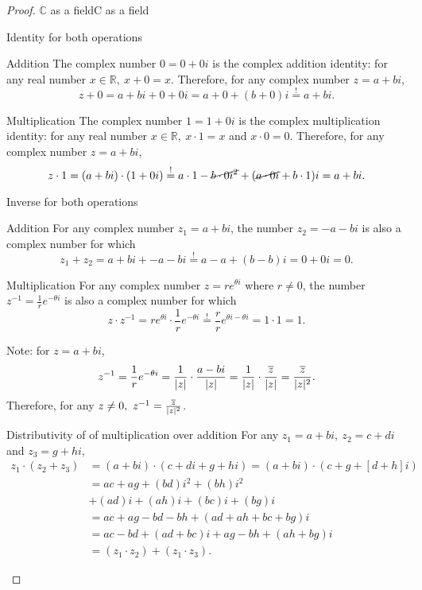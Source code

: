 \begin{proof}{$\bm{\mathbb{C}}$ as a field}{C as a field}
\begin{descitemize}
		\item[Identity for both operations]~\\
			\begin{listitemize}
			\item[Addition] The complex number $0=0+0i$ is the complex addition identity: for any real number $x\in\mathbb{R},\ x+0=x$. Therefore, for any complex number $z=a+bi$,
				\[
					z+0 = a+bi + 0+0i = a+0 + (b+0)i \overset{!}{=} a+bi.
				\]
			\item[Multiplication] The complex number $1=1+0i$ is the complex multiplication identity: for any real number $x\in\mathbb{R},\ x\cdot1=x$ and $x\cdot0=0$. Therefore, for any complex number $z=a+bi$,
				\[
					z\cdot1 = (a+bi)\cdot(1+0i) \overset{!}{=}a\cdot1-\cancel{b\cdot0i^{2}} + (\cancel{a\cdot0i}+b\cdot1)i = a+bi.
				\]

			\end{listitemize}
		
		\item[Inverse for both operations]~\\
			\begin{listitemize}
			\item[Addition] For any complex number $z_{1}=a+bi$, the number $z_{2}=-a-bi$ is also a complex number for which
				\[
					z_{1} + z_{2} = a+bi + -a-bi \overset{!}{=} a-a + (b-b)i = 0 + 0i = 0.
				\]
			\item[Multiplication] For any complex number $z=re^{\theta i}$ where $r\neq0$, the number $z^{-1}=\frac{1}{r}e^{-\theta i}$ is also a complex number for which
				\[
					z \cdot z^{-1} = re^{\theta i} \cdot \frac{1}{r}e^{-\theta i} \overset{!}{=} \frac{r}{r}e^{\theta i - \theta i} = 1\cdot1 = 1.
				\]
				
			Note: for $z=a+bi$,
			\[
				z^{-1} = \frac{1}{r}e^{-\theta i} = \frac{1}{|z|}\cdot\frac{a-bi}{|z|} = \frac{1}{|z|}\cdot\frac{\overline{z}}{|z|} = \frac{\overline{z}}{|z|^{2}}.
			\]
			Therefore, for any $z\neq0,\ z^{-1} = \frac{\overline{z}}{|z|^{2}}$.
			\end{listitemize}

		\item[Distributivity of of multiplication over addition] For any $z_{1}=a+bi,\ z_{2}=c+di$ and $z_{3}=g+hi$,
			\begin{align*}
				z_{1}\cdot(z_{2}+z_{3}) &= (a+bi)\cdot(c+di + g+hi) = (a+bi)\cdot(c+g + [d+h]i)\\
				&= ac + ag + (bd)i^{2} + (bh)i^{2}\\
				&+ (ad)i + (ah)i + (bc)i + (bg)i\\
				&= ac + ag - bd - bh + (ad + ah + bc + bg)i\\
				&= ac-bd + (ad+bc)i + ag-bh + (ah+bg)i\\
				&= (z_{1}\cdot z_{2}) + (z_{1}\cdot z_{3}).
			\end{align*}
	\end{descitemize}
\end{proof}

